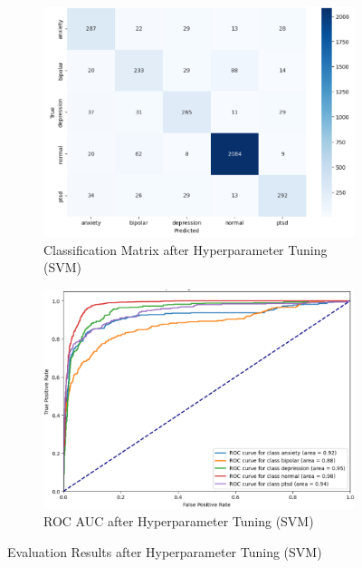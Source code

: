 \begin{figure}[h!]
    \centering
    \begin{subfigure}[b]{0.49\textwidth}
        \centering
        \includegraphics[width=\textwidth]{Images/HP SVM CM.png}
        \caption{Classification Matrix after Hyperparameter Tuning (SVM)}
        \label{LSTMROC6}  %
    \end{subfigure}
    \hfill
    \begin{subfigure}[b]{0.49\textwidth}
        \centering
        \includegraphics[width=\textwidth]{Images/HP SVM ROC.png}
        \caption{ROC AUC after Hyperparameter Tuning (SVM)}
        \label{LSTMROC}  %
    \end{subfigure}
    \caption{Evaluation Results after Hyperparameter Tuning (SVM)}
    \label{fig:hp_svm_comparison}
\end{figure}

